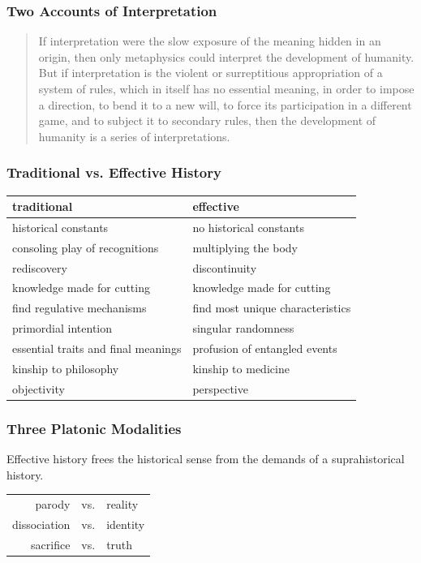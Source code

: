 \documentclass[xcolor=dvipsnames]{beamer}
\begin{document}
\begin{frame}
  \frametitle{Two Accounts of Interpretation}
  \begin{quote}
    If interpretation were the slow exposure of the meaning hidden in
    an origin, then only metaphysics could interpret the development
    of humanity. But if interpretation is the violent or surreptitious
    appropriation of a system of rules, which in itself has no
    essential meaning, in order to impose a direction, to bend it to a
    new will, to force its participation in a different game, and to
    subject it to secondary rules, then the development of humanity is
    a series of interpretations.
  \end{quote}
\end{frame}

\begin{frame}
  \frametitle{Traditional vs. Effective History}
  \begin{tabular}{|l|l|}\hline
    \textbf{traditional} & \textbf{effective} \\ \hline
    historical constants & no historical constants \\ \hline
    consoling play of recognitions & multiplying the body \\ \hline
    rediscovery & discontinuity \\ \hline
    knowledge made for cutting & knowledge made for cutting \\ \hline
    find regulative mechanisms & find most unique characteristics \\ \hline
    primordial intention & singular randomness \\ \hline
    essential traits and final meanings & profusion of entangled events \\ \hline
    kinship to philosophy & kinship to medicine \\ \hline
    objectivity & perspective \\ \hline
  \end{tabular}
\end{frame}

\begin{frame}
  \frametitle{Three Platonic Modalities}
  Effective history frees the historical sense from the demands of a
  suprahistorical history.

  \bigskip

  \begin{tabular}{rcl}
    parody & vs. & reality \\
    dissociation & vs. & identity \\
    sacrifice & vs. & truth \\
  \end{tabular}
\end{frame}
\end{document}
